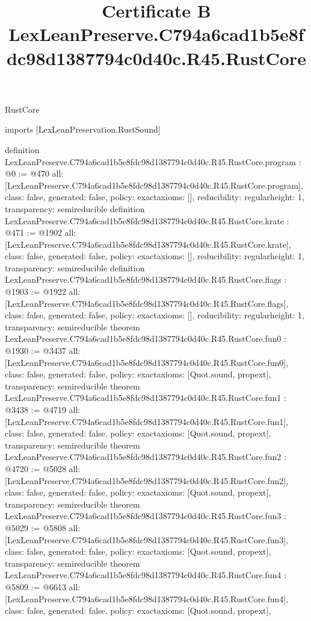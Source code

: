 \begin{lexlean}{RustCore}
\title{Certificate B LexLeanPreserve.C794a6cad1b5e8fdc98d1387794c0d40c.R45.RustCore}
\begin{coremodule}
imports [LexLeanPreservation.RustSound]

definition LexLeanPreserve.C794a6cad1b5e8fdc98d1387794c0d40c.R45.RustCore.program : @0 := @470 {
  all: [LexLeanPreserve.C794a6cad1b5e8fdc98d1387794c0d40c.R45.RustCore.program],
  class: false,
  generated: false,
  policy: exact{axioms: []},
  reducibility: regular{height: 1},
  transparency: semireducible
}
definition LexLeanPreserve.C794a6cad1b5e8fdc98d1387794c0d40c.R45.RustCore.krate : @471 := @1902 {
  all: [LexLeanPreserve.C794a6cad1b5e8fdc98d1387794c0d40c.R45.RustCore.krate],
  class: false,
  generated: false,
  policy: exact{axioms: []},
  reducibility: regular{height: 1},
  transparency: semireducible
}
definition LexLeanPreserve.C794a6cad1b5e8fdc98d1387794c0d40c.R45.RustCore.flags : @1903 := @1922 {
  all: [LexLeanPreserve.C794a6cad1b5e8fdc98d1387794c0d40c.R45.RustCore.flags],
  class: false,
  generated: false,
  policy: exact{axioms: []},
  reducibility: regular{height: 1},
  transparency: semireducible
}
theorem LexLeanPreserve.C794a6cad1b5e8fdc98d1387794c0d40c.R45.RustCore.fun0 : @1930 := @3437 {
  all: [LexLeanPreserve.C794a6cad1b5e8fdc98d1387794c0d40c.R45.RustCore.fun0],
  class: false,
  generated: false,
  policy: exact{axioms: [Quot.sound, propext]},
  transparency: semireducible
}
theorem LexLeanPreserve.C794a6cad1b5e8fdc98d1387794c0d40c.R45.RustCore.fun1 : @3438 := @4719 {
  all: [LexLeanPreserve.C794a6cad1b5e8fdc98d1387794c0d40c.R45.RustCore.fun1],
  class: false,
  generated: false,
  policy: exact{axioms: [Quot.sound, propext]},
  transparency: semireducible
}
theorem LexLeanPreserve.C794a6cad1b5e8fdc98d1387794c0d40c.R45.RustCore.fun2 : @4720 := @5028 {
  all: [LexLeanPreserve.C794a6cad1b5e8fdc98d1387794c0d40c.R45.RustCore.fun2],
  class: false,
  generated: false,
  policy: exact{axioms: [Quot.sound, propext]},
  transparency: semireducible
}
theorem LexLeanPreserve.C794a6cad1b5e8fdc98d1387794c0d40c.R45.RustCore.fun3 : @5029 := @5808 {
  all: [LexLeanPreserve.C794a6cad1b5e8fdc98d1387794c0d40c.R45.RustCore.fun3],
  class: false,
  generated: false,
  policy: exact{axioms: [Quot.sound, propext]},
  transparency: semireducible
}
theorem LexLeanPreserve.C794a6cad1b5e8fdc98d1387794c0d40c.R45.RustCore.fun4 : @5809 := @6613 {
  all: [LexLeanPreserve.C794a6cad1b5e8fdc98d1387794c0d40c.R45.RustCore.fun4],
  class: false,
  generated: false,
  policy: exact{axioms: [Quot.sound, propext]},
}
\end{coremodule}
\end{lexlean}
